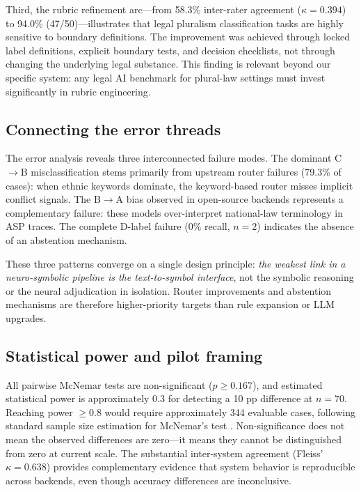 \documentclass[pdflatex,sn-basic,Numbered]{sn-jnl}
\begin{document}
Third, the rubric refinement arc---from 58.3\% inter-rater agreement ($\kappa = 0.394$) to 94.0\% (47/50)---illustrates that legal pluralism classification tasks are highly sensitive to boundary definitions.
The improvement was achieved through locked label definitions, explicit boundary tests, and decision checklists, not through changing the underlying legal substance.
This finding is relevant beyond our specific system: any legal AI benchmark for plural-law settings must invest significantly in rubric engineering.

\subsection{Connecting the error threads}\label{subsec:disc-errors}

The error analysis reveals three interconnected failure modes.
The dominant C$\rightarrow$B misclassification stems primarily from upstream router failures (79.3\% of cases): when ethnic keywords dominate, the keyword-based router misses implicit conflict signals.
The B$\rightarrow$A bias observed in open-source backends represents a complementary failure: these models over-interpret national-law terminology in ASP traces.
The complete D-label failure (0\% recall, $n=2$) indicates the absence of an abstention mechanism.

These three patterns converge on a single design principle: \textit{the weakest link in a neuro-symbolic pipeline is the text-to-symbol interface}, not the symbolic reasoning or the neural adjudication in isolation.
Router improvements and abstention mechanisms are therefore higher-priority targets than rule expansion or LLM upgrades.

\subsection{Statistical power and pilot framing}\label{subsec:disc-power}

All pairwise McNemar tests are non-significant ($p \geq 0.167$), and estimated statistical power is approximately 0.3 for detecting a 10 pp difference at $n=70$.
Reaching power $\geq 0.8$ would require approximately 344 evaluable cases, following standard sample size estimation for McNemar's test \cite{lachin1992power}.
Non-significance does not mean the observed differences are zero---it means they cannot be distinguished from zero at current scale.
The substantial inter-system agreement (Fleiss' $\kappa = 0.638$) provides complementary evidence that system behavior is reproducible across backends, even though accuracy differences are inconclusive.
\end{document}

